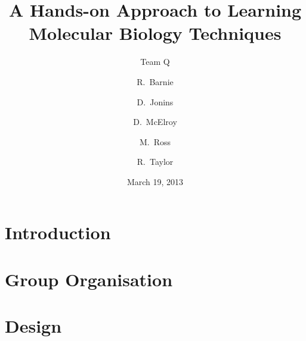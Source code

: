 \documentclass{beamer}
\title[PCR]{A Hands-on Approach to Learning Molecular Biology Techniques}
\subtitle{Team Q}
\author{R.~Barnie \and D.~Jonins \and D.~McElroy \and M.~Ross \and R.~Taylor}
\date{March 19, 2013}
\begin{document}
\section{Introduction}


\section{Group Organisation}


\section{Design}



\end{document}
